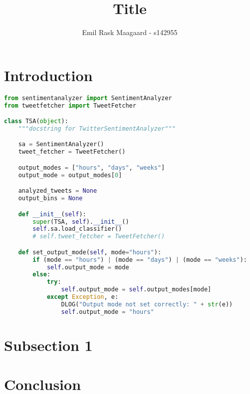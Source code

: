 \documentclass{dtu_report_columns}
\title{Title}
\author{Emil Rask Maagaard - s142955}
\begin{document}
\maketitle{}
\titlepage



\section*{Introduction}



\begin{lstlisting}[language=Python]
from sentimentanalyzer import SentimentAnalyzer
from tweetfetcher import TweetFetcher

class TSA(object):
    """docstring for TwitterSentimentAnalyzer"""

    sa = SentimentAnalyzer()
    tweet_fetcher = TweetFetcher()

    output_modes = ["hours", "days", "weeks"]
    output_mode = output_modes[0]

    analyzed_tweets = None
    output_bins = None

    def __init__(self):
        super(TSA, self).__init__()
        self.sa.load_classifier()
        # self.tweet_fetcher = TweetFetcher()

    def set_output_mode(self, mode="hours"):
        if (mode == "hours") | (mode == "days") | (mode == "weeks"):
            self.output_mode = mode
        else:
            try:
                self.output_mode = self.output_modes[mode]
            except Exception, e:
                DLOG("Output mode not set correctly: " + str(e))
                self.output_mode = "hours"

\end{lstlisting}


\newpage
\section*{Subsection 1}



\newpage
\section*{Conclusion}

\end{document}
